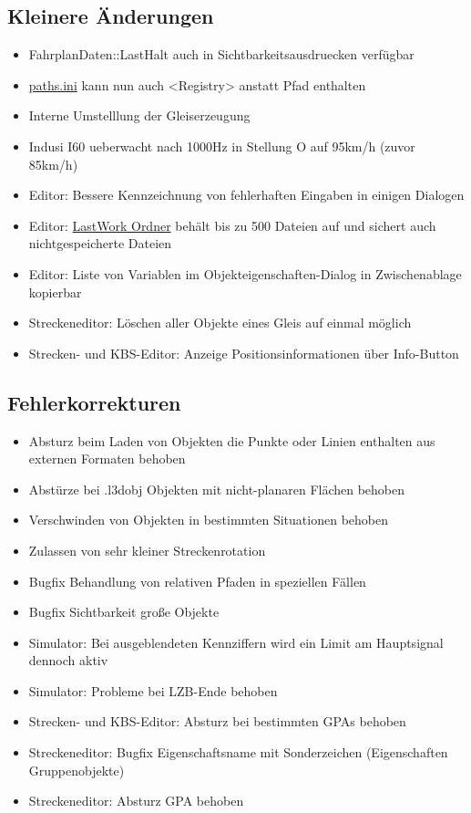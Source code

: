 \subsection{Kleinere Änderungen}
\begin{itemize}
\item FahrplanDaten::LastHalt auch in Sichtbarkeitsausdruecken verfügbar
\item \hyperref[sec:sim-optionen-paths]{paths.ini} kann nun auch <Registry> anstatt Pfad enthalten
\item Interne Umstelllung der Gleiserzeugung
\item Indusi I60 ueberwacht nach 1000Hz in Stellung O auf 95km/h (zuvor 85km/h)
\item Editor: Bessere Kennzeichnung von fehlerhaften Eingaben in einigen Dialogen
\item Editor: \hyperref[sec:sec:editor-lastwork]{LastWork Ordner} behält bis zu 500 Dateien auf und sichert auch nichtgespeicherte Dateien
\item Editor: Liste von Variablen im Objekteigenschaften-Dialog in Zwischenablage kopierbar
\item Streckeneditor: Löschen aller Objekte eines Gleis auf einmal möglich
\item Strecken- und KBS-Editor: Anzeige Positionsinformationen über Info-Button
\end{itemize}


\subsection{Fehlerkorrekturen}
\begin{itemize}
\item Absturz beim Laden von Objekten die Punkte oder Linien enthalten aus externen Formaten behoben
\item Abstürze bei .l3dobj Objekten mit nicht-planaren Flächen behoben
\item Verschwinden von Objekten in bestimmten Situationen behoben
\item Zulassen von sehr kleiner Streckenrotation
\item Bugfix Behandlung von relativen Pfaden in speziellen Fällen
\item Bugfix Sichtbarkeit große Objekte 
\item Simulator: Bei ausgeblendeten Kennziffern wird ein Limit am Hauptsignal dennoch aktiv
\item Simulator: Probleme bei LZB-Ende behoben
\item Strecken- und KBS-Editor: Absturz bei bestimmten GPAs behoben
\item Streckeneditor: Bugfix Eigenschaftsname mit Sonderzeichen (Eigenschaften Gruppenobjekte)
\item Streckeneditor: Absturz GPA behoben
\end{itemize}


